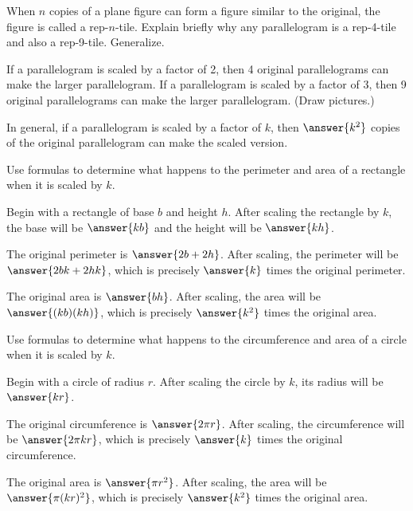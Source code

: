\documentclass[nooutcomes]{ximera}
\begin{document}
\begin{question}
When $n$ copies of a plane figure can form a figure similar to the original, the figure is called a rep-$n$-tile.  Explain briefly why any parallelogram is a rep-4-tile and also a rep-9-tile.  Generalize.  
\begin{freeResponse}
\begin{hint}
If a parallelogram is scaled by a factor of 2, then 4 original parallelograms can make the larger parallelogram.  If a parallelogram is scaled by a factor of 3, then 9 original parallelograms can make the larger parallelogram.  (Draw pictures.)
\end{hint}
\end{freeResponse}

In general, if a parallelogram is scaled by a factor of $k$, then $\answer{k^2}$ copies of the original parallelogram can make the scaled version.  
\end{question}

\begin{question}
Use formulas to determine what happens to the perimeter and area of a rectangle when it is scaled by $k$.  

Begin with a rectangle of base $b$ and height $h$.  After scaling the rectangle by $k$, the base will be $\answer{kb}$ and the height will be $\answer{kh}$.  

The original perimeter is $\answer{2b + 2h}$.  After scaling, the perimeter will be $\answer{2bk + 2hk}$, which is precisely $\answer{k}$ times the original perimeter.  

The original area is $\answer{bh}$.  After scaling, the area will be $\answer{(kb)(kh)}$, which is precisely $\answer{k^2}$ times the original area.  
\end{question}


\begin{question}
Use formulas to determine what happens to the circumference and area of a circle when it is scaled by $k$.  

Begin with a circle of radius $r$.  After scaling the circle by $k$, its radius will be $\answer{kr}$.  

The original circumference is $\answer{2\pi r}$.  After scaling, the circumference will be $\answer{2\pi kr}$, which is precisely $\answer{k}$ times the original circumference.  

The original area is $\answer{\pi r^2}$.  After scaling, the area will be $\answer{\pi (kr)^2}$, which is precisely $\answer{k^2}$ times the original area.  
\end{question}
\end{document}

